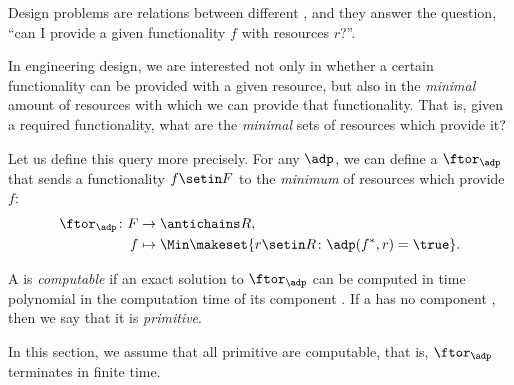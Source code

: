 
\label{sec:computation}

Design problems are relations between different , and they answer the question, ``can I provide a given functionality $f$ with resources $r$?''.

In engineering design, we are interested not only in whether a certain functionality can be provided with a given resource, but also in the \emph{minimal} amount of resources with which we can provide that functionality.
That is, given a required functionality, what are the \emph{minimal} sets of resources which provide it?

Let us define this query more precisely.
For any  $\adp$, we can define a  $\ftor_\adp$ that sends a functionality $f \setin F$ to the \emph{minimum}  of resources which provide~$f$:
\begin{equation}
    \begin{aligned}
        \ftor_\adp \colon F & \to \antichains R, \\
        f                   & \mapsto \Min \makeset{ r \setin R \colon \adp(f^*, r) = \true }.
    \end{aligned}
\end{equation}

\begin{definition}\label{def:dp-computable}
    A  is \emph{computable} if an exact solution to $\ftor_\adp$ can be computed in time polynomial in the computation time of its component .
    If a  has no component , then we say that it is \emph{primitive}.
\end{definition}

In this section, we assume that all primitive  are computable, that is, $\ftor_\adp$ terminates in finite time.


